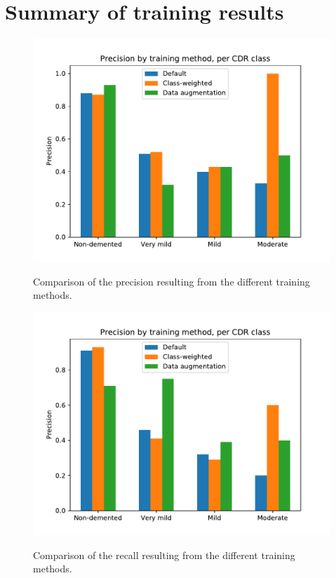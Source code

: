 \documentclass{kththesis}
\begin{document}
\section{Summary of training results}
\begin{figure}[H]
  \centering
  \includegraphics[width=0.8\linewidth]{img/precision_comparison.pdf}
  \label{fig:precision_comparison}
  \caption{Comparison of the precision resulting from the different training methods.}
\end{figure}
\begin{figure}[H]
  \centering
  \includegraphics[width=0.8\linewidth]{img/recall_comparison.pdf}
  \label{fig:recall_comparison}
  \caption{Comparison of the recall resulting from the different training methods.}
\end{figure}
\end{document}
